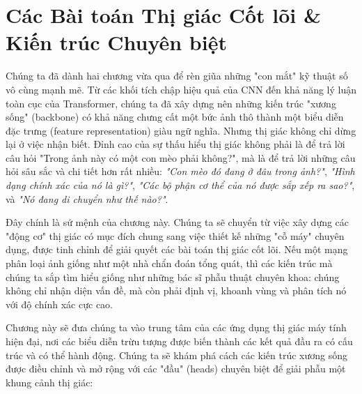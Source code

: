 \chapter{Các Bài toán Thị giác Cốt lõi \& Kiến trúc Chuyên biệt}
\label{chap:core_vision_tasks}

Chúng ta đã dành hai chương vừa qua để rèn giũa những "con mắt" kỹ thuật số vô cùng mạnh mẽ. Từ các khối tích chập hiệu quả của CNN đến khả năng lý luận toàn cục của Transformer, chúng ta đã xây dựng nên những kiến trúc "xương sống" (backbone) có khả năng chưng cất một bức ảnh thô thành một biểu diễn đặc trưng (feature representation) giàu ngữ nghĩa. Nhưng thị giác không chỉ dừng lại ở việc nhận biết. Đỉnh cao của sự thấu hiểu thị giác không phải là để trả lời câu hỏi "Trong ảnh này có một con mèo phải không?", mà là để trả lời những câu hỏi sâu sắc và chi tiết hơn rất nhiều: \textit{"Con mèo đó đang ở đâu trong ảnh?"}, \textit{"Hình dạng chính xác của nó là gì?"}, \textit{"Các bộ phận cơ thể của nó được sắp xếp ra sao?"}, và \textit{"Nó đang di chuyển như thế nào?"}.

Đây chính là sứ mệnh của chương này. Chúng ta sẽ chuyển từ việc xây dựng các "động cơ" thị giác có mục đích chung sang việc thiết kế những "cỗ máy" chuyên dụng, được tinh chỉnh để giải quyết các bài toán thị giác cốt lõi. Nếu một mạng phân loại ảnh giống như một nhà chẩn đoán tổng quát, thì các kiến trúc mà chúng ta sắp tìm hiểu giống như những bác sĩ phẫu thuật chuyên khoa: chúng không chỉ nhận diện vấn đề, mà còn phải định vị, khoanh vùng và phân tích nó với độ chính xác cực cao.

Chương này sẽ đưa chúng ta vào trung tâm của các ứng dụng thị giác máy tính hiện đại, nơi các biểu diễn trừu tượng được biến thành các kết quả đầu ra có cấu trúc và có thể hành động. Chúng ta sẽ khám phá cách các kiến trúc xương sống được điều chỉnh và mở rộng với các "đầu" (heads) chuyên biệt để giải phẫu một khung cảnh thị giác:

